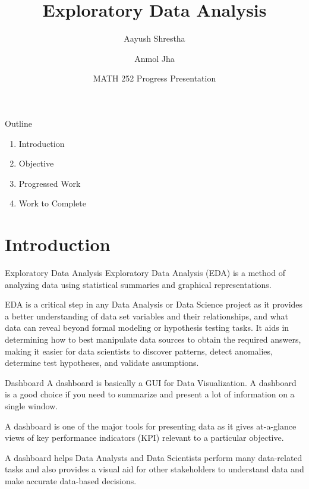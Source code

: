 \documentclass{beamer}
\title{Exploratory Data Analysis}
\date{\small MATH 252 Progress Presentation}
\institute{Kathmandu University \\ Department of Computational Mathematics}
\author{Aayush Shrestha \and Anmol Jha}
\begin{document}
	
	\begin{frame}
		\titlepage
	\end{frame}
	
	\begin{frame}{Outline}
		\begin{enumerate}
			\item Introduction
			\item Objective
			\item Progressed Work
			\item Work to Complete
		\end{enumerate}
	\end{frame}
	
	\section{Introduction}
	\begin{frame}{Exploratory Data Analysis}
		Exploratory Data Analysis (EDA) is a method of analyzing data using statistical summaries and graphical representations.
		
		EDA is a critical step in any Data Analysis or Data Science project as it provides a better understanding of data set variables and their relationships, and what data can reveal beyond formal modeling or hypothesis testing tasks. It aids in determining how to best manipulate data sources to obtain the required answers, making it easier for data scientists to discover patterns, detect anomalies, determine test hypotheses, and validate assumptions.
	\end{frame}
	
	\begin{frame}{Dashboard}
		A dashboard is basically a GUI for Data Visualization. A dashboard is a good choice if you need to summarize and present a lot of information on a single window.
		
		A dashboard is one of the major tools for presenting data as it gives at-a-glance views of key performance indicators (KPI) relevant to a particular objective.
		
		A dashboard helps Data Analysts and Data Scientists perform many data-related tasks and also provides a visual aid for other stakeholders to understand data and make accurate data-based decisions.
	\end{frame}
	
\end{document}
